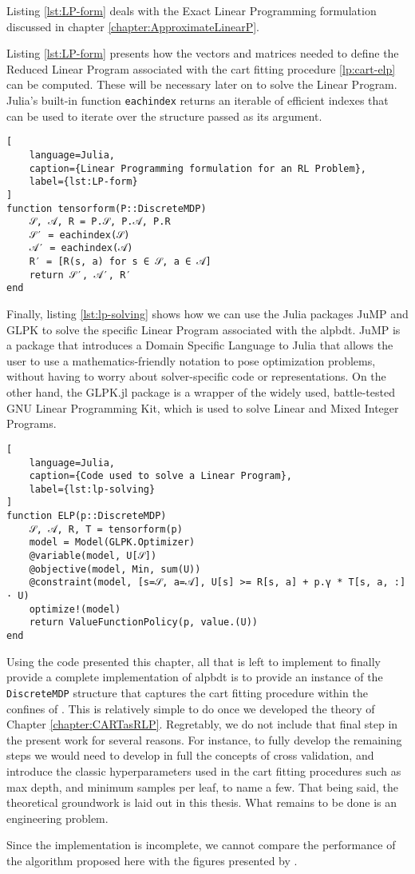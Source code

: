 Listing \ref{lst:LP-form} deals with the Exact Linear Programming formulation
discussed in chapter \ref{chapter:ApproximateLinearP}.

Listing \ref{lst:LP-form} presents how the vectors and matrices needed to define
the Reduced Linear Program associated with the \ac{cart} fitting procedure
\eqref{lp:cart-elp} can be computed. These will be necessary later on to solve
the Linear Program. Julia's built-in function \lstinline{eachindex} returns an
iterable of efficient indexes that can be used to iterate over the structure
passed as its argument.

\begin{lstlisting}[
    language=Julia,
    caption={Linear Programming formulation for an RL Problem},
    label={lst:LP-form}
]
function tensorform(P::DiscreteMDP)
    𝒮, 𝒜, R = P.𝒮, P.𝒜, P.R
    𝒮′ = eachindex(𝒮)
    𝒜′ = eachindex(𝒜)
    R′ = [R(s, a) for s ∈ 𝒮, a ∈ 𝒜]
    return 𝒮′, 𝒜′, R′
end
\end{lstlisting}

Finally, listing \ref{lst:lp-solving} shows how we can use the Julia packages
JuMP and GLPK to solve the specific Linear Program associated with the
\ac{alpbdt}. JuMP is a package that introduces a Domain Specific Language to
Julia that allows the user to use a mathematics-friendly notation to pose
optimization problems, without having to worry about solver-specific code or
representations. On the other hand, the GLPK.jl package is a wrapper of the
widely used, battle-tested GNU Linear Programming Kit, which is used to solve
Linear and Mixed Integer Programs.

\begin{lstlisting}[
    language=Julia,
    caption={Code used to solve a Linear Program},
    label={lst:lp-solving}
]
function ELP(p::DiscreteMDP)
    𝒮, 𝒜, R, T = tensorform(p)
    model = Model(GLPK.Optimizer)
    @variable(model, U[𝒮])
    @objective(model, Min, sum(U))
    @constraint(model, [s=𝒮, a=𝒜], U[s] >= R[s, a] + p.γ * T[s, a, :] · U)
    optimize!(model)
    return ValueFunctionPolicy(p, value.(U))
end
\end{lstlisting}

Using the code presented this chapter, all that is left to implement to finally
provide a complete implementation of \ac{alpbdt} is to provide an instance of
the \lstinline{DiscreteMDP} structure that captures the \ac{cart} fitting
procedure within the confines of . This is relatively simple to do once
we developed the theory of Chapter \ref{chapter:CARTasRLP}. Regretably, we do
not include that final step in the present work for several reasons. For
instance, to fully develop the remaining steps we would need to develop in full
the concepts of cross validation, and introduce the classic hyperparameters used
in the \ac{cart} fitting procedures such as max depth, and minimum samples per
leaf, to name a few. That being said, the theoretical groundwork is laid out in
this thesis. What remains to be done is an engineering problem.

Since the implementation is incomplete, we cannot compare the performance of the
algorithm proposed here with the figures presented by \citeauthor{xiong}.